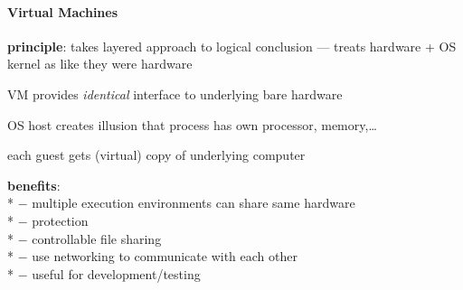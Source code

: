 \paragraph{Virtual Machines}
\begin{items}
  \item \textbf{principle}: takes layered approach to logical conclusion --- treats hardware + OS kernel as like they were hardware
  \item VM provides \emph{identical} interface to underlying bare hardware
  \item OS host creates illusion that process has own processor, memory,\dots
  \item each guest gets (virtual) copy of underlying computer
  \item \textbf{benefits}: \\*
    $ - $ multiple execution environments can share same hardware \\*
    $ - $ protection \\*
    $ - $ controllable file sharing \\*
    $ - $ use networking to communicate with each other \\*
    $ - $ useful for development/testing
\end{items}